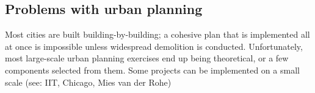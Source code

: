 \documentclass{article}
\begin{document}
    \subsection{Problems with urban planning}
    \begin{outline}
        \1 Most cities are built building-by-building; a cohesive plan that is implemented all at once is impossible unless widespread demolition is conducted. 
        \1 Unfortunately, most large-scale urban planning exercises end up being theoretical, or a few components selected from them. Some projects can be implemented on a small scale (see: IIT, Chicago, Mies van der Rohe)
    \end{outline}
\end{document}

